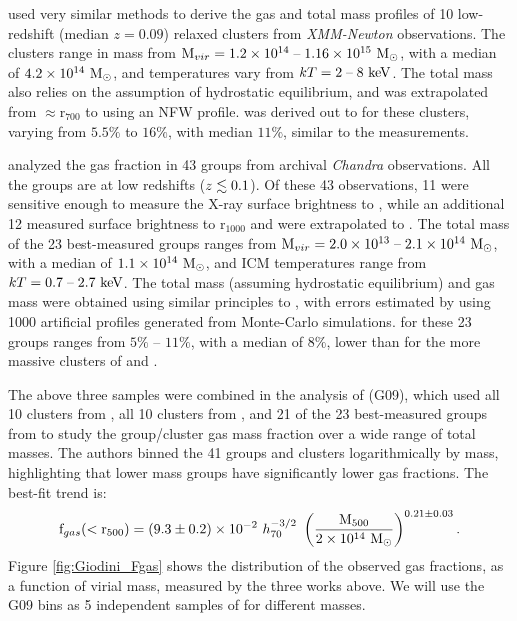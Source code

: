 \textbf{\citet{Arnaud2007}} used very similar methods to derive the
gas and total mass profiles of 10 low-redshift (median $z = 0.09$)
relaxed clusters from \textit{XMM-Newton} observations. The clusters
range in mass from $\textrm{M\ensuremath{_{vir}}} = 1.2\times 10^{14}\;\textrm{--}\;1.16 \times 10^{15}~\textrm{M}_\odot$,
with a median of $4.2 \times 10^{14}~\textrm{M}_\odot$, and temperatures vary from
$kT = 2\;\textrm{--}\;8~\textrm{keV}$. The total mass also relies on the
assumption of hydrostatic equilibrium, and was extrapolated from
$\approx$r$_{700}$ to \rfive{} using an NFW profile.  \fg{} was derived
out to \rfive{} for these clusters, varying from $5.5\%$ to $16\%$,
with median $11\%$, similar to the \citet{Vikhlinin2006} measurements.

\textbf{\citet{Sun2009}} analyzed the gas fraction in 43 groups from
archival \textit{Chandra} observations. All the groups are at low
redshifts ($z \lesssim 0.1$). Of these 43 observations, 11 were sensitive
enough to measure the X-ray surface brightness to \rfive{}, while an
additional 12 measured surface brightness to r$_{1000}$ and were
extrapolated to \rfive{}. The total mass of the 23 best-measured
groups ranges from $\textrm{M\ensuremath{_{vir}}} = 2.0\times 10^{13}\;\textrm{--}\;2.1 \times 10^{14}~\textrm{M}_\odot$, with a
median of $1.1 \times 10^{14}~\textrm{M}_\odot$, and ICM temperatures range from
$kT = 0.7\;\textrm{--}\;2.7~\textrm{keV}$. The total mass (assuming hydrostatic
equilibrium) and gas mass were obtained using similar principles to
\citet{Vikhlinin2006}, with errors estimated by using 1000 artificial
profiles generated from Monte-Carlo simulations. \fgfive{} for
these 23 groups ranges from $5\%$ -- $11\%$, with a median of $8\%$,
lower than for the more massive clusters of \citet{Vikhlinin2006} and
\citet{Arnaud2007}.



The above three samples were combined in the analysis of
\textbf{\citet{Giodini2009}} (G09), which used all 10 clusters from
\citet{Vikhlinin2006}, all 10 clusters from \citet{Arnaud2007}, and 21
of the 23 best-measured groups from \citet{Sun2009} to study the
group/cluster gas mass fraction over a wide range of total masses. The
authors binned the 41 groups and clusters logarithmically by mass,
highlighting that lower mass groups have significantly lower gas
fractions. The best-fit trend is:
\begin{equation}
\textrm{f\ensuremath{_{gas}}}(<\textrm{r\ensuremath{_{500}}}) = (9.3 \pm 0.2)\times 10^{-2}~h_{70}^{-3/2}~
\left(\frac{\textrm{M\ensuremath{_{500}}}}{2\times 10^{14}~\textrm{M}_\odot}\right)^{0.21 \pm 0.03}.
\end{equation}
Figure \ref{fig:Giodini_Fgas} shows the distribution of the observed
gas fractions, as a function of virial mass, measured by the three
works above. We will use the G09 bins as 5 independent samples of
\fg{} for different masses.


